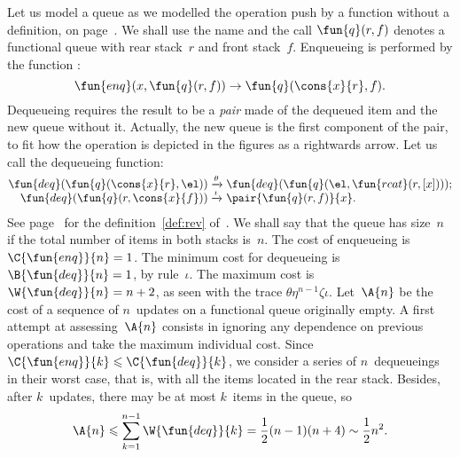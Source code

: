 Let us model a queue as we modelled the operation push by a function
 without a definition, on
page~\pageref{par:stacks}. We shall use the name
 and the call \(\fun{q}(r,f)\) denotes a
functional queue with rear stack~\(r\) and front
stack~\(f\). Enqueueing is performed by the function
:
\begin{equation}
\fun{enq}(x,\fun{q}(r,f)) \rightarrow \fun{q}(\cons{x}{r},f).
\label{def:enq}
\end{equation}
Dequeueing requires the result to be a \emph{pair} made of the dequeued item and the new queue without
it. Actually, the new queue is the first component of the pair, to fit
how the operation is depicted in the figures as a rightwards arrow.
Let us call  the
dequeueing function:
\begin{equation}
\begin{array}{@{}r@{\;}l@{\;}l@{}}
  \fun{deq}(\fun{q}(\cons{x}{r},\el))
& \xrightarrow{\smash{\theta}}
& \fun{deq}(\fun{q}(\el,\fun{rcat}(r,[x])));\\
  \fun{deq}(\fun{q}(r,\cons{x}{f}))
& \xrightarrow{\smash{\iota}}
& \pair{\fun{q}(r,f)}{x}.
\end{array}
\label{def:deq}
\end{equation}
See page~\pageref{def:rev} for the definition~\eqref{def:rev}
of~. We shall say that the queue
has size~\(n\) if the total number of items in both stacks
is~\(n\). The cost of enqueueing is
\(\C{\fun{enq}}{n} = 1\). The minimum
cost for dequeueing is
\(\B{\fun{deq}}{n} = 1\), by rule~\(\iota\). The maximum cost is
\(\W{\fun{deq}}{n} = n+2\), as seen with the trace
\(\theta\eta^{n-1}\zeta\iota\). Let~\(\A{n}\) be the cost of a
sequence of \(n\)~updates on a functional queue originally empty. A
first attempt at assessing~\(\A{n}\) consists in ignoring any
dependence on previous operations and take the maximum individual
cost. Since \(\C{\fun{enq}}{k} \leqslant \C{\fun{deq}}{k}\), we
consider a series of \(n\)~dequeueings in their worst case, that is,
with all the items located in the rear stack. Besides, after
\(k\)~updates, there may be at most \(k\)~items in the queue, so
\begin{equation*}
\A{n} \leqslant \sum_{k=1}^{n-1}{\W{\fun{deq}}{k}} =
\frac{1}{2}{(n-1)(n+4)} \sim \frac{1}{2}{n^2}.
\end{equation*}

